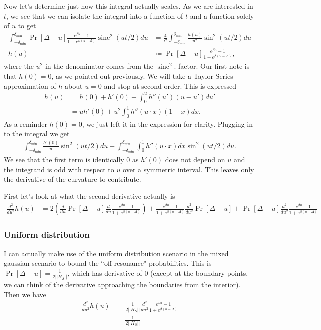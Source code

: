 \documentclass[
 amsmath,amssymb,
 aps,
onecolumn, 
nofootinbib]{revtex4-2}
\newcommand{\parens}[1]{\left( #1 \right)}
\newcommand{\norm}[1]{\left|\left| #1 \right|\right|}
\DeclareMathOperator{\sinc}{sinc}
\begin{document}
Now let's determine just how this integral actually scales. As we are interested in $t$, we see that we can isolate the integral into a function of $t$ and a function solely of $u$ to get
\begin{align}
    \int_{-\delta_{\min}}^{\delta_{\min}} \Pr[\Delta - u] \frac{ e^{\beta u}  - 1}{1 + e^{\beta (u - \Delta)}} \sinc^2(u t / 2) du &= \frac{4}{t^2} \int_{-\delta_{\min}}^{\delta_{\min}} \frac{h(u)}{u^2} \sin^2 (u t /2) d u \\
    h(u) &\coloneqq \Pr[\Delta - u] \frac{e^{\beta u } - 1}{1 + e^{\beta(u - \Delta)}} ,
\end{align}
where the $u^2$ in the denominator comes from the $\sinc^2$. factor. Our first note is that $h(0) = 0$, as we pointed out previously. We will take a Taylor Series approximation of $h$ about $u = 0$ and stop at second order. This is expressed
\begin{align}
    h(u) &= h(0) + h'(0) + \int_0^u h''(u') (u - u') du' \nonumber \\
    &= u h'(0) + u^2 \int_0^1 h''(u \cdot x) (1 - x) dx.
\end{align}
As a reminder $h(0) = 0$, we just left it in the expression for clarity.
Plugging in to the integral we get
\begin{align}
    \int_{-\delta_{\min}}^{\delta_{\min}} \frac{h'(0)}{u} \sin^2(ut /2) du + \int_{-\delta_{\min}}^{\delta_{\min}} \int_{0}^1 h''(u \cdot x) dx \sin^2(u t /2) du.
\end{align}
We see that the first term is identically 0 as $h'(0)$ does not depend on $u$ and the integrand is odd with respect to $u$ over a symmetric interval. This leaves only the derivative of the curvature to contribute. 

First let's look at what the second derivative actually is
\begin{align}
     \frac{d^2}{du^2} h(u) &=  2\parens{\frac{d}{du} \Pr[\Delta - u] \frac{d}{du} \frac{e^{\beta u} - 1}{1 + e^{\beta (u- \Delta)}}} + \frac{e^{\beta u} - 1}{1 + e^{\beta(u - \Delta)}} \frac{d^2}{du^2} \Pr[\Delta - u] + \Pr[\Delta - u] \frac{d^2}{du^2} \frac{e^{\beta u} - 1}{1 + e^{\beta (u- \Delta)}}
\end{align}

\subsubsection{Uniform distribution}
I can actually make use of the uniform distribution scenario in the mixed gaussian scenario to bound the ``off-resonance" probabilities. This is $\Pr[\Delta - u] = \frac{1}{2 \norm{H_S}}$, which has derivative of 0 (except at the boundary points, we can think of the derivative approaching the boundaries from the interior). Then we have 
\begin{align}
    \frac{d^2}{du^2} h(u) &= \frac{1}{2 \norm{H_S}} \frac{d^2}{du^2} \frac{e^{\beta u} - 1}{1 + e^{\beta (u- \Delta)}} \nonumber \\
    &= \frac{1}{2 \norm{H_S}} 
\end{align}
\end{document}
